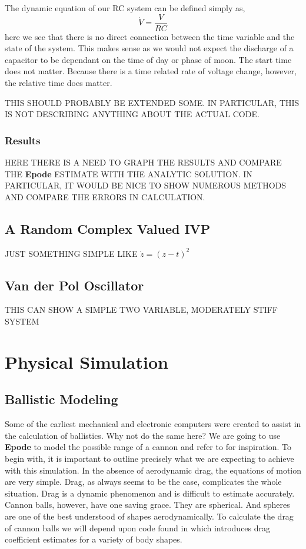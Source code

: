 \documentclass[letterpaper,10pt]{book}
\newcommand{\epode}[0]{\textbf{Epode}}
\begin{document}
      The dynamic equation of our RC system can be defined simply as,
      \begin{equation}
	\dot{V} = \frac{V}{RC}
      \end{equation}
      here we see that there is no direct connection between the time variable and the state of the system.  This makes sense as we would not expect the discharge of a capacitor to be dependant on the time of day or phase of moon.  The start time does not matter.  Because there is a time related rate of voltage change, however, the relative time does matter.
      
      THIS SHOULD PROBABLY BE EXTENDED SOME. IN PARTICULAR, THIS IS NOT DESCRIBING ANYTHING ABOUT THE ACTUAL CODE.
      
      \subsection{Results}
      HERE THERE IS A NEED TO GRAPH THE RESULTS AND COMPARE THE \epode{} ESTIMATE WITH THE ANALYTIC SOLUTION.  IN PARTICULAR, IT WOULD BE NICE TO SHOW NUMEROUS METHODS AND COMPARE THE ERRORS IN CALCULATION.
    
    \section{A Random Complex Valued IVP}
      JUST SOMETHING SIMPLE LIKE $\dot{z} = (z - t)^{2}$

    \section{Van der Pol Oscillator}
      THIS CAN SHOW A SIMPLE TWO VARIABLE, MODERATELY STIFF SYSTEM

  \chapter{Physical Simulation}
    \section{Ballistic Modeling}\label{sec:ballistic-modeling}
      Some of the earliest mechanical and electronic computers were created to assist in the calculation of ballistics.  Why not do the same here?  We are going to use \epode{} to model the possible range of a cannon and refer to \cite{wade2011going} for inspiration.  To begin with, it is important to outline precisely what we are expecting to achieve with this simulation.  In the absence of aerodynamic drag, the equations of motion are very simple.  Drag, as always seems to be the case, complicates the whole situation.  Drag is a dynamic phenomenon and is difficult to estimate accurately.  Cannon balls, however, have one saving grace.  They are spherical.  And spheres are one of the best understood of shapes aerodynamically.  To calculate the drag of cannon balls we will depend upon code found in \cite{yager2014calculating} which introduces drag coefficient estimates for a variety of body shapes.
      
\end{document}
